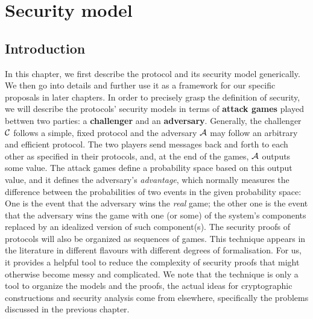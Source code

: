 
\chapter{Security model}
\ifpdf
    \graphicspath{{Chapter3/Figs/Raster/}{Chapter3/Figs/PDF/}{Chapter3/Figs/}}
\else
    \graphicspath{{Chapter3/Figs/Vector/}{Chapter3/Figs/}}
\fi

\section{Introduction}
\label{sec:syntaxModel}
In this chapter, we first describe the protocol and its security model generically.
We then go into details and further use it as a framework for our specific
proposals in later chapters. In order to precisely grasp  the definition of security,
we will describe the protocols' security models in terms of \textbf{attack
  games} played bettwen two parties: a \textbf{challenger} and an
\textbf{adversary}. Generally, the challenger \(\mathcal{C}\) follows a simple,
fixed protocol and the adversary \(\mathcal{A}\) may follow an arbitrary and
efficient protocol. The two players send messages back and forth to each other
as specified in their protocols, and, at the end of the games, \(\mathcal{A}\)
outputs some value. The attack games define a probability space based on this
output value, and it defines the adversary's \textit{advantage}, which normally
measures the difference between the probabilities of two events in the given
probability space: One is the event that the adversary wins the \textit{real}
game; the other one is the event that the adversary wins the game with one (or
some) of the system's components replaced by an idealized version of such
component(s). The security proofs of protocols will also be organized as
sequences of games. This technique appears in the literature in different flavours
with different degrees of formalisation. For us, it provides a helpful tool
to reduce the complexity of security proofs that might otherwise become
messy and complicated. We note that the technique is only a tool to organize the
models and the proofs, the actual ideas for cryptographic constructions and
security analysis come from elsewhere, specifically the problems discussed in
the previous chapter.

